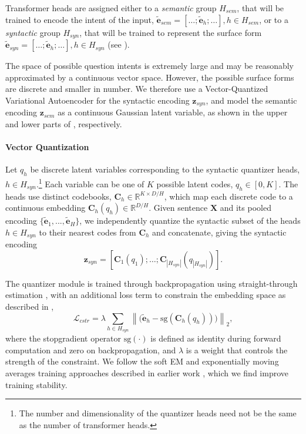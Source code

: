 \documentclass[11pt,a4paper]{article}
\begin{document}
Transformer heads are assigned either to a \textit{semantic} group $H_{sem}$, that
will be trained to encode the intent of the input,
$\tilde{\textbf{e}}_{sem} = [\ldots;\tilde{\textbf{e}}_h; \ldots ], h
\in H_{sem}$, or to a \textit{syntactic} group $H_{syn}$, that will be
trained to represent the surface form $\tilde{\textbf{e}}_{syn} =
[\ldots;\tilde{\textbf{e}}_h; \ldots ], h \in H_{syn}$ (see
). 

The space of possible question intents is
extremely large and may be reasonably approximated by a continuous
vector space. However, the possible surface forms are discrete and
smaller in number. We therefore use a
Vector-Quantized Variational Autoencoder \citep[VQ-VAE,][]{vqvae} for
the syntactic encoding $\textbf{z}_{syn}$, and model the semantic encoding
$\textbf{z}_{sem}$ as a continuous Gaussian latent variable, as shown in the upper and
lower parts of , respectively.

\paragraph{Vector Quantization}



Let $q_h$ be discrete latent variables
corresponding to the syntactic quantizer heads, $h \in H_{syn}$.\footnote{The
  number and dimensionality of the quantizer heads need not be the
  same as the number of transformer heads.} Each variable can be one
of $K$ possible latent codes, $q_h \in [0, K]$. The heads use distinct
codebooks, $\textbf{C}_h \in \mathbb{R}^{K \times D/H}$,
which map each discrete code to a continuous embedding
$\textbf{C}_h(q_h) \in \mathbb{R}^{D/H}$. Given sentence
$\textbf{X}$ and its pooled encoding
$\{\tilde{\textbf{e}}_1,...,\tilde{\textbf{e}}_{H}\}$,
we independently quantize the syntactic subset of the heads $h
\in H_{syn}$ to their nearest codes from $\textbf{C}_h$ and
concatenate, giving the syntactic encoding
\begin{equation}
  \textbf{z}_{syn} = [\textbf{C}_1(q_1); \ldots;\textbf{C}_{|H_{syn}|}(q_{|H_{syn}|})].
\end{equation}

The quantizer
module is trained through backpropagation using straight-through
estimation \cite{Bengio2013EstimatingOP}, with an additional loss term
to constrain the embedding space as described in \citet{vqvae},
\begin{equation}
  \mathcal{L}_{cstr} = \lambda \sum_{h \in H_{syn}} \left \lVert   \Big ( \tilde{\textbf{e}}_{h} - \text{sg}(\textbf{C}_h(q_h)) \Big ) \right \rVert_2 ,
\end{equation}
where the stopgradient operator $\text{sg}(\cdot)$ is defined as identity during
forward computation and zero on backpropagation, and $\lambda$ is a weight that controls the strength of the constraint. We follow the soft EM and exponentially moving averages training
approaches described in earlier work
\cite{roy-theory-experiments,angelidis2020extractive}, which we find improve training stability. 
\end{document}
